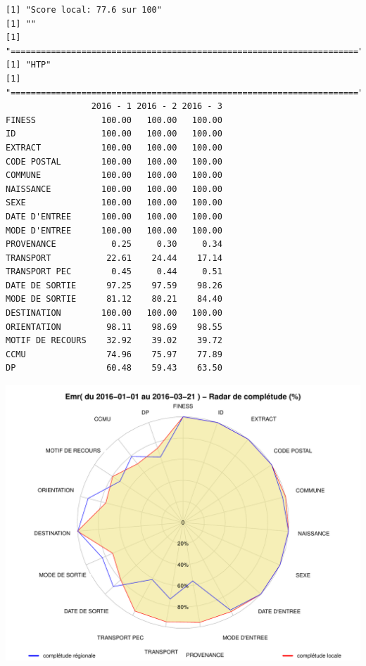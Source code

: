 \documentclass[]{article}
\begin{document}
\begin{verbatim}
[1] "Score local: 77.6 sur 100"
[1] ""
[1] "====================================================================="
[1] "HTP"
[1] "====================================================================="
                 2016 - 1 2016 - 2 2016 - 3
FINESS             100.00   100.00   100.00
ID                 100.00   100.00   100.00
EXTRACT            100.00   100.00   100.00
CODE POSTAL        100.00   100.00   100.00
COMMUNE            100.00   100.00   100.00
NAISSANCE          100.00   100.00   100.00
SEXE               100.00   100.00   100.00
DATE D'ENTREE      100.00   100.00   100.00
MODE D'ENTREE      100.00   100.00   100.00
PROVENANCE           0.25     0.30     0.34
TRANSPORT           22.61    24.44    17.14
TRANSPORT PEC        0.45     0.44     0.51
DATE DE SORTIE      97.25    97.59    98.26
MODE DE SORTIE      81.12    80.21    84.40
DESTINATION        100.00   100.00   100.00
ORIENTATION         98.11    98.69    98.55
MOTIF DE RECOURS    32.92    39.02    39.72
CCMU                74.96    75.97    77.89
DP                  60.48    59.43    63.50
\end{verbatim}

\includegraphics{completude_files/figure-latex/finess-3.pdf}
\end{document}
